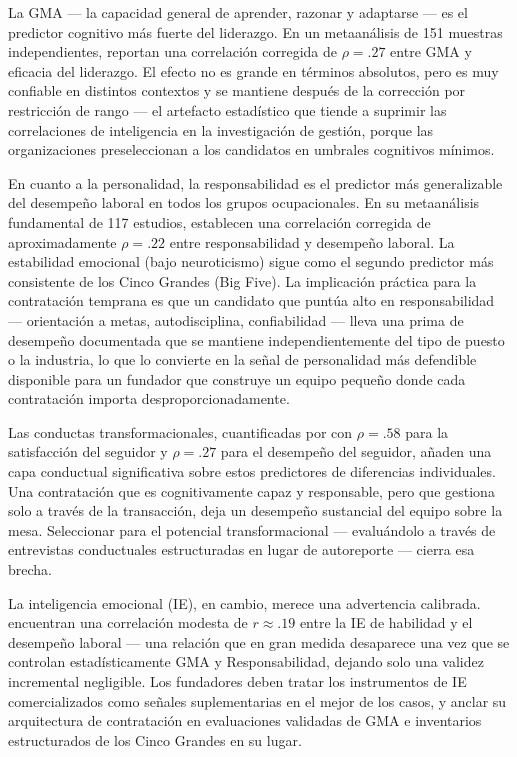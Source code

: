 La GMA --- la capacidad general de aprender, razonar y adaptarse --- es el predictor cognitivo
más fuerte del liderazgo. En un metaanálisis de \num{151} muestras independientes,
\textcite{judge2004intelligence} reportan una correlación corregida de \(\rho = .27\) entre GMA
y eficacia del liderazgo. El efecto no es grande en términos absolutos, pero es muy confiable en
distintos contextos y se mantiene después de la corrección por restricción de rango --- el
artefacto estadístico que tiende a suprimir las correlaciones de inteligencia en la investigación
de gestión, porque las organizaciones preseleccionan a los candidatos en umbrales cognitivos
mínimos.

En cuanto a la personalidad, la responsabilidad es el predictor más generalizable del desempeño
laboral en todos los grupos ocupacionales. En su metaanálisis fundamental de \num{117} estudios,
\textcite{barrick1991big} establecen una correlación corregida de aproximadamente \(\rho = .22\)
entre responsabilidad y desempeño laboral. La estabilidad emocional (bajo neuroticismo) sigue
como el segundo predictor más consistente de los Cinco Grandes (Big Five). La implicación
práctica para la contratación temprana es que un candidato que puntúa alto en responsabilidad ---
orientación a metas, autodisciplina, confiabilidad --- lleva una prima de desempeño documentada
que se mantiene independientemente del tipo de puesto o la industria, lo que lo convierte en la
señal de personalidad más defendible disponible para un fundador que construye un equipo pequeño
donde cada contratación importa desproporcionadamente.

Las conductas transformacionales, cuantificadas por \textcite{judge2004transformational} con
\(\rho = .58\) para la satisfacción del seguidor y \(\rho = .27\) para el desempeño del
seguidor, añaden una capa conductual significativa sobre estos predictores de diferencias
individuales. Una contratación que es cognitivamente capaz y responsable, pero que gestiona solo
a través de la transacción, deja un desempeño sustancial del equipo sobre la mesa. Seleccionar
para el potencial transformacional --- evaluándolo a través de entrevistas conductuales
estructuradas en lugar de autoreporte --- cierra esa brecha.

La inteligencia emocional (IE), en cambio, merece una advertencia calibrada.
\textcite{joseph2010emotional} encuentran una correlación modesta de \(r \approx .19\) entre la
IE de habilidad y el desempeño laboral --- una relación que en gran medida desaparece una vez que
se controlan estadísticamente GMA y Responsabilidad, dejando solo una validez incremental
negligible. Los fundadores deben tratar los instrumentos de IE comercializados como señales
suplementarias en el mejor de los casos, y anclar su arquitectura de contratación en evaluaciones
validadas de GMA e inventarios estructurados de los Cinco Grandes en su lugar.

